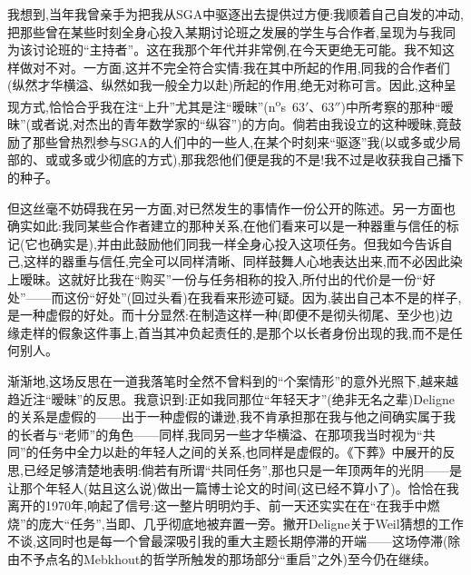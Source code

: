 我想到,当年我曾亲手为把我从SGA中驱逐出去提供过方便:我顺着自己自发的冲动,把那些曾在某些时刻全身心投入某期讨论班之发展的学生与合作者,呈现为与我同为该讨论班的“主持者”。这在我那个年代并非常例,在今天更绝无可能。我不知这样做对不对。一方面,这并不完全符合实情:我在其中所起的作用,同我的合作者们(纵然才华横溢、纵然如我一般全力以赴)所起的作用,绝无对称可言。因此,这种呈现方式,恰恰合乎我在注“上升”尤其是注“暧昧”(n\textsuperscript{o}s~63$'$、63$''$)中所考察的那种“暧昧”(或者说,对杰出的青年数学家的“纵容”)的方向。倘若由我设立的这种暧昧,竟鼓励了那些曾热烈参与SGA的人们中的一些人,在某个时刻来“驱逐”我(以或多或少局部的、或或多或少彻底的方式),那我怨他们便是我的不是!我不过是收获我自己播下的种子。

但这丝毫不妨碍我在另一方面,对已然发生的事情作一份公开的陈述。另一方面也确实如此:我同某些合作者建立的那种关系,在他们看来可以是一种器重与信任的标记(它也确实是),并由此鼓励他们同我一样全身心投入这项任务。但我如今告诉自己,这样的器重与信任,完全可以同样清晰、同样鼓舞人心地表达出来,而不必因此染上暧昧。这就好比我在“购买”一份与任务相称的投入,所付出的代价是一份“好处”——而这份“好处”(回过头看)在我看来形迹可疑。因为,装出自己本不是的样子,是一种虚假的好处。而十分显然:在制造这样一种(即便不是彻头彻尾、至少也)边缘走样的假象这件事上,首当其冲负起责任的,是那个以长者身份出现的我,而不是任何别人。

渐渐地,这场反思在一道我落笔时全然不曾料到的“个案情形”的意外光照下,越来越趋近注“暧昧”的反思。我意识到:正如我同那位“年轻天才”(绝非无名之辈)Deligne的关系是虚假的——出于一种虚假的谦逊,我不肯承担那在我与他之间确实属于我的长者与“老师”的角色——同样,我同另一些才华横溢、在那项我当时视为“共同”的任务中全力以赴的年轻人之间的关系,也同样是虚假的。《下葬》中展开的反思,已经足够清楚地表明:倘若有所谓“共同任务”,那也只是一年顶两年的光阴——是让那个年轻人(姑且这么说)做出一篇博士论文的时间(这已经不算小了)。恰恰在我离开的1970年,响起了信号:这一整片明明灼手、前一天还实实在在“在我手中燃烧”的庞大“任务”,当即、几乎彻底地被弃置一旁。撇开Deligne关于Weil猜想的工作不谈,这同时也是每一个曾最深吸引我的重大主题长期停滞的开端\dmark{}——这场停滞(除由不予点名的Mebkhout的哲学所触发的那场部分“重启”之外)至今仍在继续。


